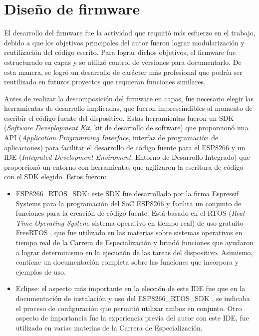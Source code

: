 

\section{Diseño de firmware}

El desarrollo del firmware fue la actividad que requirió más esfuerzo en el trabajo, debido a que los objetivos principales del autor fueron lograr modularización y reutilización del código escrito. Para lograr dichos objetivos, el firmware fue estructurado en capas y se utilizó control de versiones para documentarlo. De esta manera, se logró un desarrollo de carácter más profesional que podría ser reutilizado en futuros proyectos que requieran funciones similares.

Antes de realizar la descomposición del firmware en capas, fue necesario elegir las herramientas de desarrollo implicadas, que fueron imprescindibles al momento de escribir el código fuente del dispositivo. Estas herramientas fueron un SDK (\textit{Software Deveplopment Kit}, kit de desarrollo de software) que proporcionó una API (\textit{Application Programming Interface}, interfaz de programación de aplicaciones) para facilitar el desarrollo de código fuente para el ESP8266 y un IDE (\textit{Integrated Development Enviroment}, Entorno de Desarrollo Integrado) que proporcionó un entorno con herramientas que agilizaron la escritura de código con el SDK elegido. Estos fueron:

\begin{itemize}
	\item ESP8266\_RTOS\_SDK: este SDK fue desarrollado por la firma Espressif Systems para la programación del SoC ESP8266 y facilita un conjunto de funciones para la creación de código fuente. Está basado en el RTOS (\textit{Real-Time Operating System}, sistema operativo en tiempo real) de uso gratuito FreeRTOS \citep{WEBSITE:18}, que fue utilizado en las materias sobre sistemas operativos en tiempo real de la Carrera de Especialización y brindó funciones que ayudaron a lograr determinismo en la ejecución de las tareas del dispositivo. Asimismo, contiene un documentación completa sobre las funciones que incorpora y ejemplos de uso.
	\item Eclipse: el aspecto más importante en la elección de este IDE fue que en la documentación de instalación y uso del ESP8266\_RTOS\_SDK \citep{WEBSITE:23}, se indicaba el proceso de configuración que permitió utilizar ambos en conjunto. Otro aspecto de importancia fue la experiencia previa del autor con este IDE, fue utilizado en varias materias de la Carrera de Especialización.
\end{itemize}

